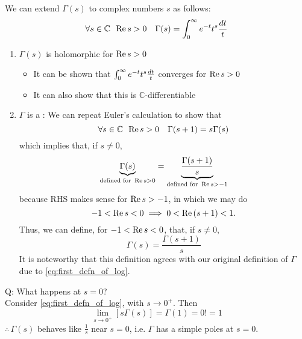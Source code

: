 \documentclass[notoc,notitlepage]{tufte-book}
\begin{document}
We can extend $\Gamma(s)$ to complex numbers $s$ as follows:
\begin{equation*}
  \forall s \in \mathbb{C} \enspace \operatorname{Re}{s} > 0 \quad \Gamma(s) = \int_{0}^{\infty} e^{-t} t^s \frac{\mathop{}\!d{t}}{t}
\end{equation*}

\begin{note}
  \begin{enumerate}
    \item $\Gamma(s)$ is holomorphic for $\operatorname{Re}{s} > 0$
    \begin{itemize}
      \item It can be shown that $\int_{0}^{\infty} e^{- t} t^s \frac{\mathop{}\!d{t}}{t}$ converges for $\operatorname{Re}{s} > 0$
      \item It can also show that this is $\mathbb{C}$-differentiable
    \end{itemize}

    \item $\Gamma$ is a : We can repeat Euler's calculation to show that
    \begin{equation*}
      \forall s \in \mathbb{C} \enspace \operatorname{Re}{s} > 0 \quad \Gamma(s + 1) = s \Gamma(s)
    \end{equation*}
    which implies that, if $s \neq 0$,
    \begin{equation*}
      \underbrace{\Gamma(s)}_{\text{defined for } \operatorname{Re}{s} > 0} = \underbrace{\frac{\Gamma(s + 1)}{s}}_{\text{defined for } \operatorname{Re}{s} > -1}
    \end{equation*}
    because RHS makes sense for $\operatorname{Re}{s} > -1$, in which we may do
    \begin{equation*}
      -1 < \operatorname{Re}{s} < 0 \implies 0 < \operatorname{Re}{(s + 1)} < 1.
    \end{equation*}
    Thus, we can define, for $-1 < \operatorname{Re}{s} < 0$, that, if $s \neq 0$,
    \begin{equation*}
      \Gamma(s) = \frac{\Gamma(s + 1)}{s}
    \end{equation*}
    It is noteworthy that this definition agrees with our original definition of $\Gamma$ due to \cref{eq:first_defn_of_log}.
  \end{enumerate}
\end{note}

Q: What happens at $s = 0$? \\
Consider \cref{eq:first_defn_of_log}, with $s \to 0^+$. Then
\begin{equation*}
  \lim_{s \to 0^+} \left[ s \Gamma(s) \right] = \Gamma(1) = 0! = 1
\end{equation*}
$\therefore \, \Gamma(s)$ behaves like $\frac{1}{s}$ near $s = 0$, i.e. $\Gamma$ has a simple poles at $s = 0$.
\end{document}
